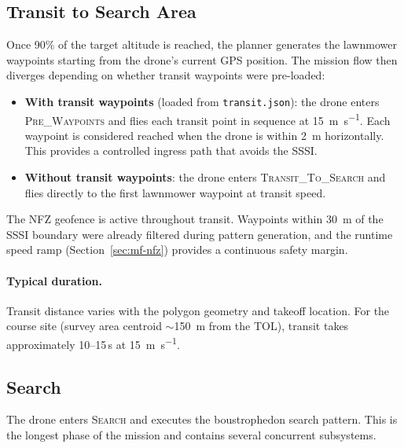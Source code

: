 \subsection{Transit to Search Area}\label{sec:mf-transit}

Once 90\% of the target altitude is reached, the planner generates the lawnmower waypoints starting from the drone's current GPS position.  The mission flow then diverges depending on whether transit waypoints were pre-loaded:

\begin{itemize}
  \item \textbf{With transit waypoints} (loaded from \texttt{transit.json}): the drone enters \textsc{Pre\_Waypoints} and flies each transit point in sequence at \SI{15}{\metre\per\second}.  Each waypoint is considered reached when the drone is within \SI{2}{\metre} horizontally.  This provides a controlled ingress path that avoids the SSSI.
  \item \textbf{Without transit waypoints}: the drone enters \textsc{Transit\_To\_Search} and flies directly to the first lawnmower waypoint at transit speed.
\end{itemize}

\noindent The NFZ geofence is active throughout transit.  Waypoints within \SI{30}{\metre} of the SSSI boundary were already filtered during pattern generation, and the runtime speed ramp (Section~\ref{sec:mf-nfz}) provides a continuous safety margin.

\paragraph{Typical duration.}  Transit distance varies with the polygon geometry and takeoff location.  For the course site (survey area centroid $\sim$\SI{150}{\metre} from the TOL), transit takes approximately 10--15\,s at \SI{15}{\metre\per\second}.

\subsection{Search}\label{sec:mf-search}

The drone enters \textsc{Search} and executes the boustrophedon search pattern.  This is the longest phase of the mission and contains several concurrent subsystems.


